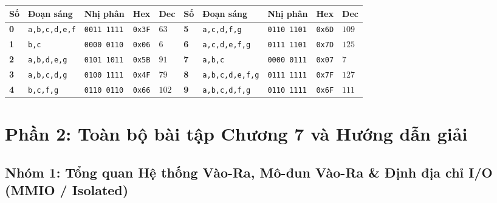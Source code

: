 \begin{tcolorbox}[bwbox, title={Bảng mã LED 7 thanh chuẩn trên RARS Digital Lab Sim (bit 0--6 ứng với a--g, bit 7 = dp)}]
\begin{center}
\renewcommand{\arraystretch}{1.2}
\small
\begin{tabularx}{\linewidth}{|Z|Z|Z|Z|Z||Z|Z|Z|Z|Z|}
\hline
\textbf{Số} & \textbf{Đoạn sáng} & \textbf{Nhị phân} & \textbf{Hex} & \textbf{Dec} & \textbf{Số} & \textbf{Đoạn sáng} & \textbf{Nhị phân} & \textbf{Hex} & \textbf{Dec} \\ \hline
\textbf{0} & \texttt{a,b,c,d,e,f} & \texttt{0011 1111} & \texttt{0x3F} & $63$ & \textbf{5} & \texttt{a,c,d,f,g} & \texttt{0110 1101} & \texttt{0x6D} & $109$ \\ \hline
\textbf{1} & \texttt{b,c} & \texttt{0000 0110} & \texttt{0x06} & $6$ & \textbf{6} & \texttt{a,c,d,e,f,g} & \texttt{0111 1101} & \texttt{0x7D} & $125$ \\ \hline
\textbf{2} & \texttt{a,b,d,e,g} & \texttt{0101 1011} & \texttt{0x5B} & $91$ & \textbf{7} & \texttt{a,b,c} & \texttt{0000 0111} & \texttt{0x07} & $7$ \\ \hline
\textbf{3} & \texttt{a,b,c,d,g} & \texttt{0100 1111} & \texttt{0x4F} & $79$ & \textbf{8} & \texttt{a,b,c,d,e,f,g} & \texttt{0111 1111} & \texttt{0x7F} & $127$ \\ \hline
\textbf{4} & \texttt{b,c,f,g} & \texttt{0110 0110} & \texttt{0x66} & $102$ & \textbf{9} & \texttt{a,b,c,d,f,g} & \texttt{0110 1111} & \texttt{0x6F} & $111$ \\ \hline
\end{tabularx}
\end{center}
\end{tcolorbox}

\newpage
\section{Phần 2: Toàn bộ bài tập Chương 7 và Hướng dẫn giải}

\subsection{Nhóm 1: Tổng quan Hệ thống Vào-Ra, Mô-đun Vào-Ra \& Định địa chỉ I/O (MMIO / Isolated)}

